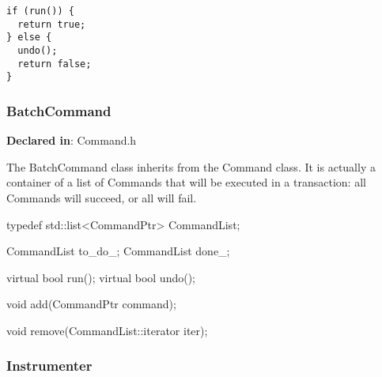 \lstset{numbers=none}
\begin{lstlisting}
if (run()) {
  return true;
} else {
  undo();
  return false;
}
\end{lstlisting}

\subsubsection{BatchCommand}
\label{sec-3.2.4}

\textbf{Declared in}: Command.h

The BatchCommand class inherits from the Command class. It is actually a
container of a list of Commands that will be executed in a transaction: all
Commands will succeed, or all will fail.


\begin{apient}
typedef std::list<CommandPtr> CommandList;

CommandList to_do_;
CommandList done_;
\end{apient}



\begin{apient}
virtual bool run();
virtual bool undo();
\end{apient}


\begin{apient}
void add(CommandPtr command);
\end{apient}



\begin{apient}
void remove(CommandList::iterator iter);
\end{apient}


\subsubsection{Instrumenter}
\label{sec-3.2.5}

